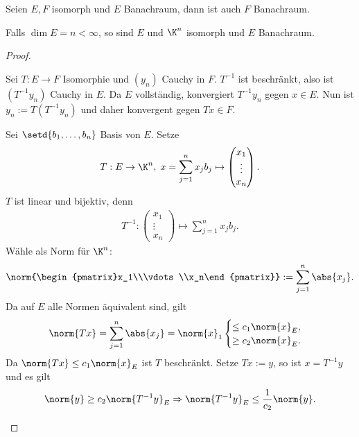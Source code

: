 \begin{prop}
\label{prop:2.3}
\begin{propenum}
  \item Seien $E,F$ isomorph und $E$ Banachraum, dann ist auch $F$ Banachraum.
  \item Falls $\dim E = n < \infty$, so sind $E$ und $\K^n$ isomorph und $E$
  Banachraum.\fishhere
\end{propenum}
\end{prop}
\begin{proof}
\begin{proofenum}
  \item Sei $T: E\to F$ Isomorphie und $(y_n)$ Cauchy in $F$. $T^{-1}$ ist
  beschränkt, also ist $(T^{-1}y_n)$ Cauchy in $E$. Da $E$ vollständig,
  konvergiert $T^{-1}y_n$ gegen $x\in E$. Nun ist $y_n := T(T^{-1}y_n)$ und
  daher konvergent gegen $Tx\in F$.
  \item Sei $\setd{b_1,\ldots,b_n}$ Basis von $E$. Setze
\begin{align*}
T: E\to\K^n,\; x=\sum\limits_{j=1}^n x_j b_j \mapsto
\begin{pmatrix}x_1\\\vdots\\x_n\end{pmatrix}.
\end{align*}
$T$ ist linear und bijektiv, denn
\begin{align*}
T^{-1}: \begin{pmatrix}x_1\\\vdots\\x_n\end{pmatrix} \mapsto
\sum\limits_{j=1}^n x_j b_j.
\end{align*}
Wähle als Norm für $\K^n$:
\begin{align*}
\norm{\begin{pmatrix}x_1\\\vdots\\x_n\end{pmatrix}} := \sum\limits_{j=1}^n
\abs{x_j}.
\end{align*}
Da auf $E$ alle Normen äquivalent sind, gilt
\begin{align*}
\norm{Tx} = \sum\limits_{j=1}^n \abs{x_j} = \norm{x}_1 
\begin{cases}
\le c_1 \norm{x}_E,\\
\ge c_2 \norm{x}_E.
\end{cases}
\end{align*}
Da $\norm{Tx}\le c_1 \norm{x}_E$ ist $T$ beschränkt. Setze $Tx:= y$, so ist $x=
T^{-1}y$ und es gilt
\begin{align*}
\norm{y} \ge c_2 \norm{T^{-1}y}_E \Rightarrow \norm{T^{-1}y}_E \le
\frac{1}{c_2}\norm{y}.\qedhere
\end{align*}
\end{proofenum}
\end{proof}

